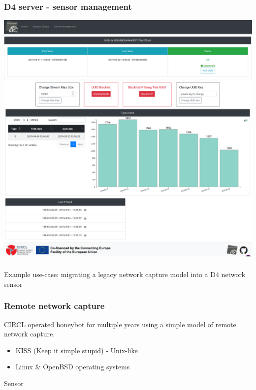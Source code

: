 \documentclass{beamer}
\begin{document}
\begin{frame}
        \frametitle{D4 server - sensor management}
        \includegraphics[width=\textwidth]{./d4-4.png}
\end{frame}

\begin{frame}
        \frametitle{}
        {\center Example use-case: migrating a legacy network capture model into a D4 network sensor
}
\end{frame}


\begin{frame}
\frametitle{Remote network capture}
    CIRCL operated honeybot for multiple years using a simple model of remote network capture.
    \begin{definition}[Principle]
        \begin{itemize}
            \item KISS (Keep it simple stupid) - Unix-like
            \item Linux \& OpenBSD operating systems
        \end{itemize}
    \end{definition}

    \begin{block}{Sensor}
    
    \end{block}
\end{frame}
\end{document}
